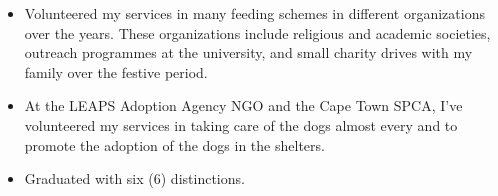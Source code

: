 \documentclass[10pt,a4paper]{altacv}
\begin{document}


\begin{itemize}
\item Volunteered my services in many feeding schemes in different organizations over the years. These
organizations include religious and academic societies, outreach programmes at the university, and
small charity drives with my family over the festive period. 
\end{itemize}


\divider


\begin{itemize}
\item At the LEAPS Adoption Agency NGO and the Cape Town SPCA, I’ve volunteered my services in
taking care of the dogs almost every and to promote the adoption of the dogs in the shelters.  

\end{itemize}

\divider




\divider

\begin{itemize}
\item Graduated with six (6) distinctions.
\end{itemize}

\divider

\end{document}

